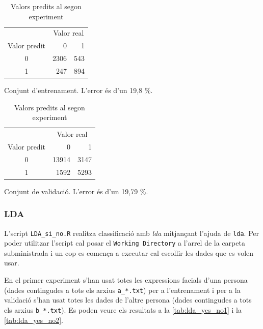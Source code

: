 \documentclass[a4paper]{article}
\begin{document}
\begin{table}[H]
	\def\arraystretch{1.5}
	\begin{subtable}[t]{0.49\textwidth}
		\centering
		\begin{tabular}{|c|rr|}
			\hline
			& \multicolumn{2}{c|}{Valor real} \\
			Valor predit & 0 & 1 \\
			\hline
			0 & 2306 & 543 \\
			1 &  247 & 894 \\
			\hline
		\end{tabular}
		\caption{Conjunt d'entrenament. L'error és d'un 19,8 \%.}
		\label{tab:reglog_training3}
	\end{subtable}
	\hfill
	\begin{subtable}[t]{0.49\textwidth}
		\centering
		\begin{tabular}{|c|rr|}
			\hline
			& \multicolumn{2}{c|}{Valor real} \\
			Valor predit & 0 & 1 \\
			\hline
			0 & 13914 & 3147 \\
			1 &  1592 & 5293 \\
			\hline
		\end{tabular}
		\caption{Conjunt de validació. L'error és d'un 19,79 \%.}
		\label{tab:reglog_training4}
	\end{subtable}
	\caption{Valors predits al segon experiment}
\end{table}

\subsubsection{LDA}
L'script \verb|LDA_si_no.R| realitza classificació amb \emph{lda} mitjançant l'ajuda de \verb|lda|. Per poder utilitzar l'script cal posar el \verb|Working Directory| a l'arrel de la carpeta subministrada i un cop es comença a executar cal escollir les dades que es volen usar. 
 
En el primer experiment s'han usat totes les expressions facials d'una persona (dades contingudes a tots els arxius \verb|a_*.txt|) per a l'entrenament i per a la validació s'han usat totes les dades de l'altre persona (dades contingudes a tots els arxius \verb|b_*.txt|). Es poden veure els resultats a la \autoref{tab:lda_yes_no1} i la 	\autoref{tab:lda_yes_no2}.
\end{document}
